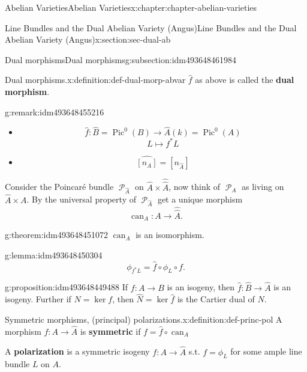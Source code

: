 \documentclass[oneside,10pt,]{book}
\newcommand{\terminology}[1]{\textbf{#1}}
\numberwithin{equation}{section}
\newcommand{\sheaf}[1]{\operatorname{\mathcal{#1}}}
\newcommand{\lb}{[}
\newcommand{\rb}{]}
\DeclareMathOperator{\Pic}{Pic}
\begin{document}
\begin{chapterptx}{Abelian Varieties}{}{Abelian Varieties}{}{}{x:chapter:chapter-abelian-varieties}
\begin{sectionptx}{Line Bundles and the Dual Abelian Variety (Angus)}{}{Line Bundles and the Dual Abelian Variety (Angus)}{}{}{x:section:sec-dual-ab}
\begin{subsectionptx}{Dual morphisms}{}{Dual morphisms}{}{}{g:subsection:idm493648461984}
%
\begin{definition}{Dual morphisms.}{x:definition:def-dual-morp-abvar}%
\(\hat f\) as above is called the \terminology{dual morphism}.%
\end{definition}
\begin{remark}{}{g:remark:idm493648455216}%
%
\begin{itemize}[label=\textbullet]
\item{}%
\begin{equation*}
\hat f\colon \hat B = \Pic^0(B) \to \hat A(k) = \Pic^0(A)
\end{equation*}
%
\begin{equation*}
L\mapsto f^*L
\end{equation*}
%
\item{}%
\begin{equation*}
\hat{\lb n_A\rb} = [n_{\hat A}]
\end{equation*}
%
\end{itemize}
%
\end{remark}
Consider the Poincaré bundle \(\sheaf P_{\hat A}\) on \(\hat A \times \hat{\hat{A}}\), now think of \(\sheaf P_A\) as living on \(\hat A \times A\). By the universal property of \(\sheaf P_{\hat A}\) get a unique morphism%
\begin{equation*}
\operatorname{can}_A\colon A\to\hat{\hat A}\text{.}
\end{equation*}
%
\begin{theorem}{}{}{g:theorem:idm493648451072}%
\(\operatorname{can}_A\) is an isomorphism.%
\end{theorem}
\begin{lemma}{}{}{g:lemma:idm493648450304}%
%
\begin{equation*}
\phi_{f^*L} = \hat f\circ \phi_L\circ f\text{.}
\end{equation*}
%
\end{lemma}
\begin{proposition}{}{}{g:proposition:idm493648449488}%
If \(f\colon A \to B\) is an isogeny, then \(\hat f\colon \hat B \to \hat A\) is an isogeny. Further if \(N  = \ker f\), then \(\hat N = \ker \hat f\) is the Cartier  dual of \(N\).%
\end{proposition}
\begin{definition}{Symmetric morphisms, (principal) polarizations.}{x:definition:def-princ-pol}%
A morphism \(f\colon A \to \hat A\) is \terminology{symmetric} if \(f = \hat f\circ \operatorname{can}_A\)%
\par
A \terminology{polarization} is a symmetric isogeny \(f\colon A \to \hat A\) s.t. \(f=  \phi_L\) for some ample line bundle \(L\) on \(A\).%

\end{definition}
\end{subsectionptx}
\end{sectionptx}
\end{chapterptx}
\end{document}
